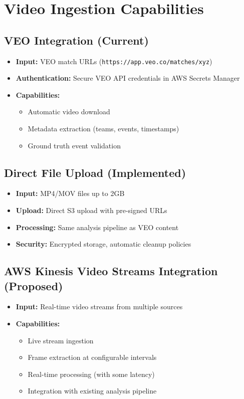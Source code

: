 \documentclass[11pt,a4paper]{article}
\begin{document}
\section{Video Ingestion Capabilities}

\subsection{VEO Integration (Current)}
\begin{itemize}[leftmargin=1.5cm]
    \item \textbf{Input:} VEO match URLs (\texttt{https://app.veo.co/matches/xyz})
    \item \textbf{Authentication:} Secure VEO API credentials in AWS Secrets Manager
    \item \textbf{Capabilities:}
    \begin{itemize}
        \item Automatic video download
        \item Metadata extraction (teams, events, timestamps)
        \item Ground truth event validation
    \end{itemize}
\end{itemize}

\subsection{Direct File Upload (Implemented)}
\begin{itemize}[leftmargin=1.5cm]
    \item \textbf{Input:} MP4/MOV files up to 2GB
    \item \textbf{Upload:} Direct S3 upload with pre-signed URLs
    \item \textbf{Processing:} Same analysis pipeline as VEO content
    \item \textbf{Security:} Encrypted storage, automatic cleanup policies
\end{itemize}

\subsection{AWS Kinesis Video Streams Integration (Proposed)}
\begin{itemize}[leftmargin=1.5cm]
    \item \textbf{Input:} Real-time video streams from multiple sources
    \item \textbf{Capabilities:}
    \begin{itemize}
        \item Live stream ingestion
        \item Frame extraction at configurable intervals
        \item Real-time processing (with some latency)
        \item Integration with existing analysis pipeline
    \end{itemize}
\end{itemize}
\end{document}
